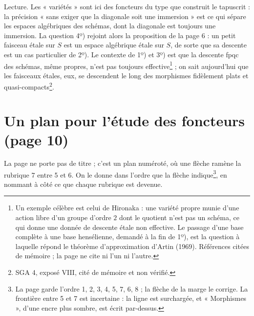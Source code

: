 \documentclass[11pt,a4paper]{article}
\begin{document}
Lecture. Les « variétés » sont ici des foncteurs du type que construit le
tapuscrit : la précision « sans exiger que la diagonale soit une immersion »
est ce qui sépare les espaces algébriques des schémas, dont la diagonale est
toujours une immersion. La question 4º) rejoint alors la proposition de la
page 6 : un petit faisceau étale sur $S$ est un espace algébrique étale sur $S$,
de sorte que sa descente est un cas particulier de 2º). Le contexte de 1º) et
3º) est que la descente fpqc des schémas, même propres, n'est pas toujours
effective\footnote{Un exemple célèbre est celui de Hironaka : une variété
propre munie d'une action libre d'un groupe d'ordre $2$ dont le quotient n'est
pas un schéma, ce qui donne une donnée de descente étale non effective. Le
passage d'une base complète à une base hensélienne, demandé à la fin de 1º), est
la question à laquelle répond le théorème d'approximation d'Artin (1969).
Références citées de mémoire ; la page ne cite ni l'un ni l'autre.} ; on
sait aujourd'hui que les faisceaux étales, eux, se descendent le long des
morphismes fidèlement plats et quasi-compacts\footnote{SGA 4, exposé VIII,
cité de mémoire et non vérifié.}.

\section*{Un plan pour l'étude des foncteurs (page 10)}

La page ne porte pas de titre ; c'est un plan numéroté, où une flèche ramène la
rubrique 7 entre 5 et 6. On le donne dans l'ordre que la flèche indique\footnote{La
page garde l'ordre 1, 2, 3, 4, 5, 7, 6, 8 ; la flèche de la marge le corrige.
La frontière entre 5 et 7 est incertaine : la ligne est surchargée, et
« Morphismes », d'une encre plus sombre, est écrit par-dessus.}, en
nommant à côté ce que chaque rubrique est devenue.
\end{document}
